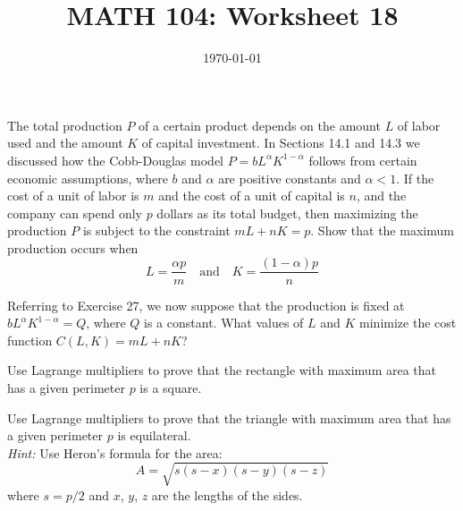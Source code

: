 \documentclass[12pt]{amsart}
\title{ MATH 104: Worksheet 18}
\author{}
\date{\today}
\begin{document}
\maketitle


\begin{question}
	The total production $P$ of a certain product depends on the amount $L$ of labor used and the amount $K$ of capital investment. In Sections 14.1 and 14.3 we discussed how the Cobb-Douglas model $P = bL^{\alpha}K^{1 - \alpha}$ follows from certain economic assumptions, where $b$ and $\alpha$ are positive constants and $\alpha < 1$. If the cost of a unit of labor is $m$ and the cost of a unit of capital is $n$, and the company can spend only $p$ dollars as its total budget, then maximizing the production $P$ is subject to the constraint $mL + nK = p$. Show that the maximum production occurs when
	\[
		L = \frac{\alpha p}{m} \quad \text{and} \quad K = \frac{(1 - \alpha)p}{n}
	\]
\end{question}

\vspace{7cm}


\begin{question}
	Referring to Exercise 27, we now suppose that the production is fixed at $bL^{\alpha}K^{1 - \alpha} = Q$, where $Q$ is a constant. What values of $L$ and $K$ minimize the cost function $C(L, K) = mL + nK$?

\end{question}


\vspace{7cm}

\begin{question}
	Use Lagrange multipliers to prove that the rectangle with maximum area that has a given perimeter $p$ is a square.
\end{question}


\vspace{7cm}

\begin{question}
	Use Lagrange multipliers to prove that the triangle with maximum area that has a given perimeter $p$ is equilateral.\\
	\textit{Hint:} Use Heron’s formula for the area:
	\[
		A = \sqrt{s(s - x)(s - y)(s - z)}
	\]
	where $s = p/2$ and $x$, $y$, $z$ are the lengths of the sides.
\end{question}


\vspace{7cm}
\end{document}
